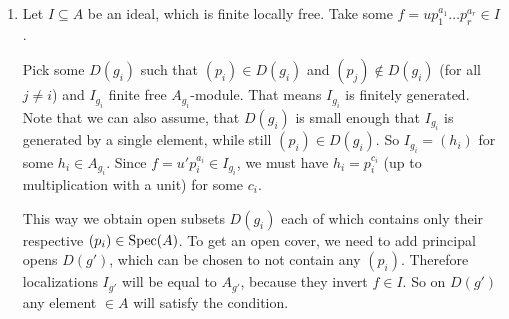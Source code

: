 \newcommand{\sheet}{8}




\maketitle{}

\begin{exercise}{1}
    \begin{enumerate}
        \item{

                Let $I \subseteq A$ be an ideal, which is finite locally free.
                Take some $f = u p^{a_1}_1 \dots p^{a_r}_r \in I$.

                Pick some $D(g_i)$ such that $(p_i) \in D(g_i)$ and $(p_j)
                \notin D(g_i)$ (for all $j \not= i$) and $I_{g_i}$ finite free
                $A_{g_i}$-module.
                That means $I_{g_i}$ is finitely generated.
                Note that we can also assume, that $D(g_i)$ is small enough that
                $I_{g_i}$ is generated by a single element, while still $(p_i) \in
                D(g_i)$. %
                So $I_{g_i} = (h_i)$ for some $h_i \in A_{g_i}$.
                Since $f = u' p^{a_i}_i \in I_{g_i}$, we must have $h_i =
                p^{c_i}_i$ (up to multiplication with a unit) for some $c_i$.

                This way we obtain open subsets $D(g_i)$ each of which contains
                only their respective $(p_i) \in \operatorname{Spec}(A)$. To get an open
                cover, we need to add principal opens $D(g')$, which can be
                chosen to not contain any $(p_i)$. Therefore localizations
                $I_{g'}$ will be equal to $A_{g'}$, because they invert $f \in
                I$. So on $D(g')$ any element $\in A$ will satisfy the
                condition.

}
\end{enumerate}
\end{exercise}
